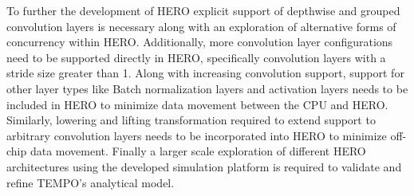 To further the development of HERO explicit support of depthwise and grouped
convolution layers is necessary along with an exploration of alternative forms
of concurrency within HERO. Additionally, more convolution layer configurations
need to be supported directly in HERO, specifically convolution layers with a
stride size greater than 1. Along with increasing convolution support, support
for other layer types like Batch normalization layers and activation layers
needs to be included in HERO to minimize data movement between the CPU and HERO.
Similarly, lowering and lifting transformation required to extend support to
arbitrary convolution layers needs to be incorporated into HERO to minimize
off-chip data movement. Finally a larger scale exploration of different HERO
architectures using the developed simulation platform is required to validate
and refine TEMPO's analytical model.